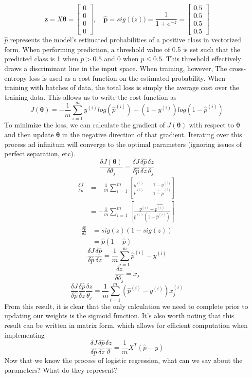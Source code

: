\documentclass[11pt,largemargins]{homework}
\begin{document}
$$\mathbf{z}=X\mathbf{\theta}=
\begin{bmatrix}
	0\\
	0\\
	0\\
	0
\end{bmatrix},\quad\mathbf{\hat{p}}=sig(\mathbf(z))= \frac{1}{1+e^{-z}}=
\begin{bmatrix}
	0.5\\
	0.5\\
	0.5\\
	0.5
\end{bmatrix}$$
$\textbf{$\hat{p}$}$ represents the model's estimated probabilities of a positive class in vectorized form. When performing prediction, a threshold value of 0.5 is set such that the predicted class is 1 when $p>0.5$ and 0 when $p\leq 0.5$. This threshold effectively draws a discriminant line in the input space. When training, however, The cross-entropy loss is used as a cost function on the estimated probability. When training with batches of data, the total loss is simply the average cost over the training data. This allows us to write the cost function as
$$J(\mathbf{\theta})=-\frac{1}{m}\sum_{i=1}^my^{(i)}log(\hat{p}^{(i)})+(1-y^{(i)})log(1-\hat{p}^{(i)})$$
To minimize the loss, we can calculate the gradient of $J(\mathbf{\theta})$ with respect to $\mathbf{\theta}$ and then update $\mathbf{\theta}$ in the negative direction of that gradient. Iterating over this process ad infinitum will converge to the optimal parameters (ignoring issues of perfect separation, etc).
$$\frac{\delta J(\mathbf{\theta})}{\delta \theta_j}=\frac{\delta J}{\delta \hat{p}}\frac{\delta \hat{p}}{\delta z}\frac{\delta z}{\theta_j}$$
\begin{align*}
	\frac{\delta J}{\delta\hat{p}} &= -\frac{1}{m}\sum_{i=1}^m\left[\frac{y^{(i)}}{\hat{p}^{(i)}}-\frac{1-y^{(i)}}{\hat{1-p}^{(i)}}\right]\\
	&= -\frac{1}{m}\sum_{i=1}^m\left[ \frac{y^{(i)}-\hat{p^{(i)}}}{\hat{p}^{(i)}(1-\hat{p}^{(i)})}\right]
\end{align*}
\begin{align*}
	\frac{\delta\hat{p}}{\delta z}&= sig(z)(1-sig(z))\\
	&= \hat{p}(1-\hat{p})
\end{align*}
$$\frac{\delta J}{\delta\hat{p}}\frac{\delta\hat{p}}{\delta z}=\frac{1}{m}\sum_{i=1}^m\hat{p}^{(i)}-y^{(i)}$$
$$\frac{\delta z}{\delta\theta_j}=x_j$$
$$\frac{\delta J}{\delta \hat{p}}\frac{\delta \hat{p}}{\delta z}\frac{\delta z}{\theta_j}=\frac{1}{m}\sum_{i=1}^m(\hat{p}^{(i)}-y^{(i)})x_j^{(i)}$$  
From this result, it is clear that the only calculation we need to complete prior to updating our weights is the sigmoid function.
It's also worth noting that this result can be written in matrix form, which allows for efficient computation when implementing
$$\frac{\delta J}{\delta \hat{p}}\frac{\delta \hat{p}}{\delta z}\frac{\delta z}{\theta}=\frac{1}{m}X^T(\hat{p}-y)$$
Now that we know the process of logistic regression, what can we say about the parameters? What do they represent?
\end{document}
